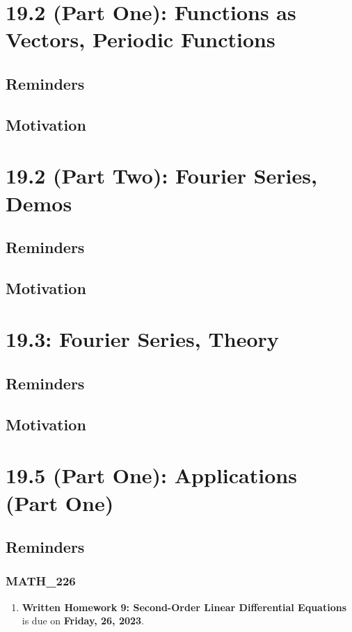 \documentclass{report}
\begin{document}
\begin{sloppypar}
\chapter{19.2 (Part One): Functions as Vectors, Periodic
  Functions}
\section{Reminders}
\section{Motivation}
\chapter{19.2 (Part Two): Fourier Series, Demos}
\section{Reminders}
\section{Motivation}
\chapter{19.3: Fourier Series, Theory}
\section{Reminders}
\section{Motivation}
\chapter{19.5 (Part One): Applications (Part One)}
\section{Reminders}
\subsection{MATH\_226}
\begin{enumerate}
  \item \textbf{Written Homework 9: Second-Order Linear Differential Equations} is due on \textbf{Friday, 26, 2023}.
\end{enumerate}


\end{sloppypar}
\end{document}
